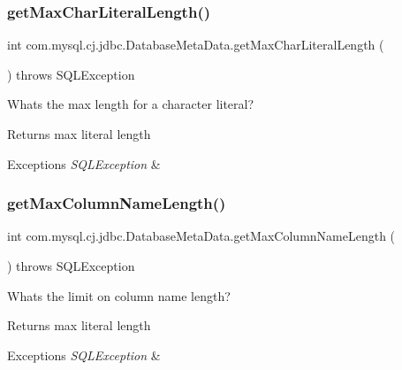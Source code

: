 \subsubsection{\texorpdfstring{get\+Max\+Char\+Literal\+Length()}{getMaxCharLiteralLength()}}
{\footnotesize\ttfamily int com.\+mysql.\+cj.\+jdbc.\+Database\+Meta\+Data.\+get\+Max\+Char\+Literal\+Length (\begin{DoxyParamCaption}{ }\end{DoxyParamCaption}) throws S\+Q\+L\+Exception}

What\textquotesingle{}s the max length for a character literal?

\begin{DoxyReturn}{Returns}
max literal length 
\end{DoxyReturn}

\begin{DoxyExceptions}{Exceptions}
{\em S\+Q\+L\+Exception} & \\
\hline
\end{DoxyExceptions}
\mbox{\label{classcom_1_1mysql_1_1cj_1_1jdbc_1_1_database_meta_data_a723662c0e2facd127edb178a26972daf}} 
\subsubsection{\texorpdfstring{get\+Max\+Column\+Name\+Length()}{getMaxColumnNameLength()}}
{\footnotesize\ttfamily int com.\+mysql.\+cj.\+jdbc.\+Database\+Meta\+Data.\+get\+Max\+Column\+Name\+Length (\begin{DoxyParamCaption}{ }\end{DoxyParamCaption}) throws S\+Q\+L\+Exception}

What\textquotesingle{}s the limit on column name length?

\begin{DoxyReturn}{Returns}
max literal length 
\end{DoxyReturn}

\begin{DoxyExceptions}{Exceptions}
{\em S\+Q\+L\+Exception} & \\
\hline
\end{DoxyExceptions}
\mbox{\label{classcom_1_1mysql_1_1cj_1_1jdbc_1_1_database_meta_data_ae18e4f3a48a9a4d1582f1fa25cb38527}} 

